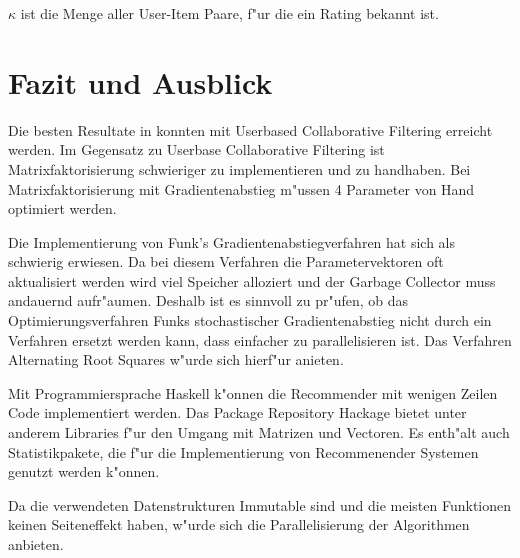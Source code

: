 \documentclass[a4paper, 12pt]{article}
\begin{document}
$\kappa$ ist die Menge aller User-Item Paare, f"ur die ein Rating bekannt ist.

\section{Fazit und Ausblick}
\label{sec:fazit}

Die besten Resultate in konnten mit Userbased Collaborative Filtering erreicht werden. Im Gegensatz zu Userbase Collaborative Filtering ist Matrixfaktorisierung schwieriger zu implementieren und zu handhaben. Bei Matrixfaktorisierung mit Gradientenabstieg m"ussen 4 Parameter von Hand optimiert werden.

Die Implementierung von Funk's Gradientenabstiegverfahren hat sich als schwierig erwiesen. Da bei diesem Verfahren die Parametervektoren oft aktualisiert werden wird viel Speicher alloziert und der Garbage Collector muss andauernd aufr"aumen. Deshalb ist es sinnvoll zu pr"ufen, ob das Optimierungsverfahren Funks stochastischer Gradientenabstieg nicht durch ein Verfahren ersetzt werden kann, dass einfacher zu parallelisieren ist. Das Verfahren Alternating Root Squares w"urde sich hierf"ur anieten.

Mit Programmiersprache Haskell k"onnen die Recommender mit wenigen Zeilen Code implementiert werden. Das Package Repository Hackage bietet unter anderem Libraries f"ur den Umgang mit Matrizen und Vectoren. Es enth"alt auch Statistikpakete, die f"ur die Implementierung von Recommenender Systemen genutzt werden k"onnen.

Da die verwendeten Datenstrukturen Immutable sind und die meisten Funktionen keinen Seiteneffekt haben, w"urde sich die Parallelisierung der Algorithmen anbieten.



\end{document}

